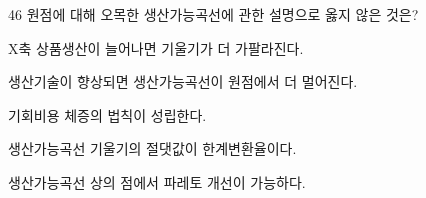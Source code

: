 \begin{question}{46}
원점에 대해 오목한 생산가능곡선에 관한 설명으로 옳지 않은 것은?
\begin{choices}
  \item X축 상품생산이 늘어나면 기울기가 더 가팔라진다.
  \item 생산기술이 향상되면 생산가능곡선이 원점에서 더 멀어진다.
  \item 기회비용 체증의 법칙이 성립한다.
  \item 생산가능곡선 기울기의 절댓값이 한계변환율이다.
  \item 생산가능곡선 상의 점에서 파레토 개선이 가능하다.
\end{choices}
\end{question}
